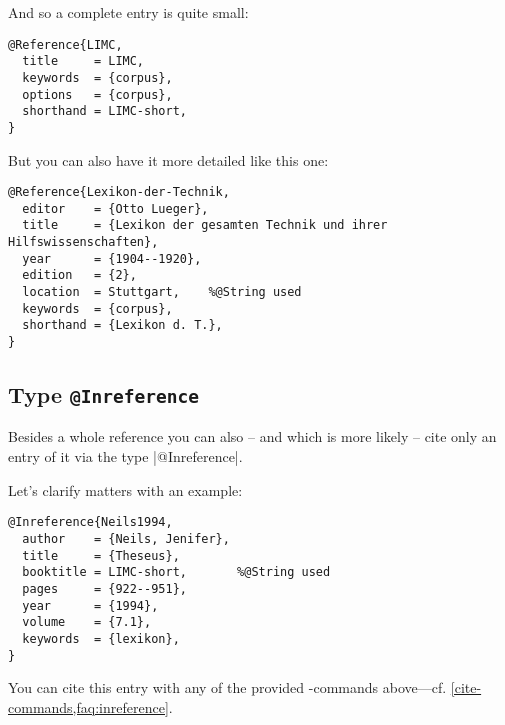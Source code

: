 \documentclass[a4paper,
10pt,
greek,
french,
spanish,
italian,
ngerman,
english
]{ltxdoc}
\begin{document}
And so a complete entry is quite small:
\begin{lstlisting}[style=bibentry,label=LIMC,caption={{@}Reference\{LIMC,…\} }]
@Reference{LIMC,
  title     = LIMC,
  keywords  = {corpus},
  options   = {corpus},
  shorthand = LIMC-short,
}
\end{lstlisting}
 
But you can also have it  more detailed  like this one:
\begin{lstlisting}[style=bibentry,label=Lexikon-der-Technik,caption={{@}Reference\{Lexikon-der-Technik,…\} }]
@Reference{Lexikon-der-Technik,
  editor    = {Otto Lueger},
  title     = {Lexikon der gesamten Technik und ihrer Hilfswissenschaften},
  year      = {1904--1920},
  edition   = {2},
  location  = Stuttgart, 	%@String used
  keywords  = {corpus},
  shorthand = {Lexikon d. T.},
}
\end{lstlisting}

 \subsection{Type \texttt{@Inreference}}\label{inreference}
Besides a whole reference you can also -- and which is more likely -- cite only an entry of it via the type  |@Inreference|.

Let’s clarify matters with an example:
\begin{lstlisting}[style=bibentry,label=Neils1994,caption={{@}Inreference\{Neils1994,…\} }]
@Inreference{Neils1994,
  author    = {Neils, Jenifer},
  title     = {Theseus},
  booktitle = LIMC-short,		%@String used
  pages     = {922--951},
  year      = {1994},
  volume    = {7.1},
  keywords  = {lexikon},
}
\end{lstlisting}
You can cite this entry with any of the provided -commands above---cf. \cref{cite-commands,faq:inreference}.
\end{document}
